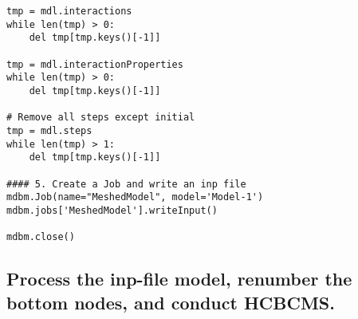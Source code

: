 \documentclass[11pt]{article}
\begin{document}
\begin{enumerate}
\begin{verbatim}
tmp = mdl.interactions
while len(tmp) > 0:
    del tmp[tmp.keys()[-1]]

tmp = mdl.interactionProperties
while len(tmp) > 0:
    del tmp[tmp.keys()[-1]]

# Remove all steps except initial
tmp = mdl.steps
while len(tmp) > 1:
    del tmp[tmp.keys()[-1]]

#### 5. Create a Job and write an inp file
mdbm.Job(name="MeshedModel", model='Model-1')
mdbm.jobs['MeshedModel'].writeInput()

mdbm.close()
\end{verbatim}
\end{enumerate}
\subsection{Process the inp-file model, renumber the bottom nodes, and conduct HCBCMS.}
\label{sec:org134ad6b}
\end{document}
